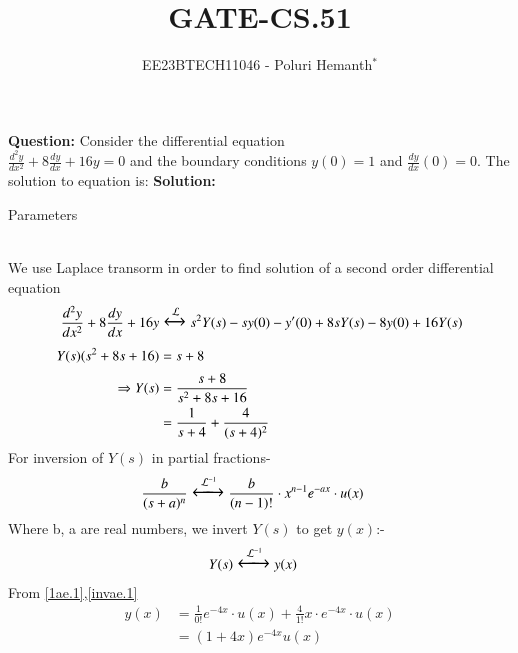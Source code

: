 \documentclass[journal,12pt,twocolumn]{IEEEtran}
\theoremstyle{remark}
\begin{document}

\vspace{3cm}

\title{GATE-CS.51}
\author{EE23BTECH11046 - Poluri Hemanth$^{*}$}
\maketitle
\textbf{Question:}
Consider the differential equation \\$\frac{d^2y}{dx^2}+8\frac{dy}{dx}+16y=0$ and the boundary conditions $y(0)=1$ and $\frac{dy}{dx}(0)=0$. The solution to equation is:
\textbf{Solution:}\\
\begin{table}[h!]
        
        \caption{Parameters}
        \label{tab:es.47}
\end{table}\\
We use Laplace transorm in order to find solution of a second order differential equation
\begin{align}
	\frac{d^2y}{dx^2}+8\frac{dy}{dx}+16y&\Large\xleftrightarrow{\mathcal{L}}s^2Y(s)-sy(0)-y'(0)+8sY(s)-8y(0)+16Y(s)\\
	Y(s)(s^2+8s+16)&=s+8\\
	\Rightarrow Y(s)&=\frac{s+8}{s^2+8s+16}\\
	&=\frac{1}{s+4}+\frac{4}{(s+4)^2}\label{1ae.1}
\end{align}
For inversion of $Y(s)$ in partial fractions-
\begin{align}
	&\frac{b}{(s+a)^n}\Large\xleftrightarrow{\mathcal{L}^{-1}}\frac{b}{(n-1)!}\cdot x^{n-1} e^{-ax}\cdot u(x)\label{invae.1}
\end{align}
Where b, a are real numbers, we invert $Y(s)$ to get $y(x)$:-\\
\begin{align}
        &Y(s)\Large\xleftrightarrow{\mathcal{L}^{-1}} y(x)
\end{align}
From \eqref{1ae.1},\eqref{invae.1}
\begin{align}
	y(x)&=\frac{1}{0!} e^{-4x}\cdot u(x)+\frac{4}{1!}x\cdot e^{-4x}\cdot u(x)\\
	&=(1+4x)e^{-4x}u(x)
\end{align}
\\
\\
\\
\\
\\
\\
\\
\end{document}
